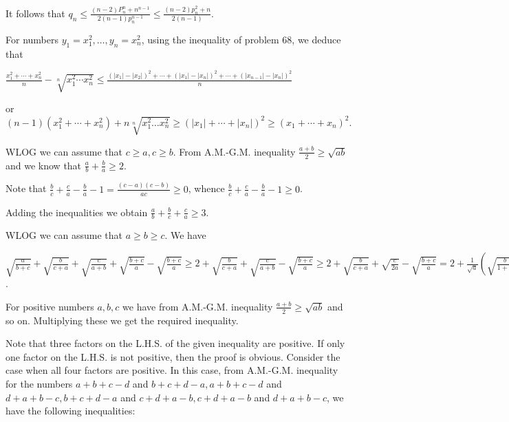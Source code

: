   It follows that $q_n\leq \frac{(n - 2)P_n^n + n^{n - 1}}{2(n - 1)p_n^{n - 1}}\leq \frac{(n - 2)p_n^2 +
    n}{2(n - 1)}$.
\item For numbers $y_1 = x_1^2, \ldots, y_n = x_n^2$, using the inequality of problem $68$, we deduce that

  $\frac{x_1^2 + \cdots + x_n^2}{n} - \sqrt[n]{x_1^2\cdots x_n^2}\leq \frac{(|x_1| - |x_2|)^2 + \cdots +
  (|x_1| - |x_n|)^2 + \cdots + (|x_{n - 1}| - |x_n|)^2}{n}$

  or $(n - 1)(x_1^2 + \cdots + x_n^2) + n\sqrt[n]{x_1^2\ldots x_n^2}\geq (|x_1| + \cdots + |x_n|)^2\geq (x_1
  + \cdots + x_n)^2$.
\item WLOG we can assume that $c\geq a, c\geq b$. From A.M.-G.M. inequality $\frac{a + b}{2}\geq \sqrt{ab}$
  and we know that $\frac{a}{b} + \frac{b}{a}\geq 2$.

  Note that $\frac{b}{c} + \frac{c}{a} - \frac{b}{a} - 1 = \frac{(c - a)(c - b)}{ac}\geq 0$, whence
  $\frac{b}{c} + \frac{c}{a} - \frac{b}{a} -1\geq 0$.

  Adding the inequalities we obtain $\frac{a}{b} + \frac{b}{c} + \frac{c}{a}\geq 3$.
\item WLOG we can assume that $a\geq b\geq c$. We have

  $\sqrt{\frac{a}{b + c}} + \sqrt{\frac{b}{c + a}} + \sqrt{\frac{c}{a + b}} + \sqrt{\frac{b + c}{a}} -
  \sqrt{\frac{b + c}{a}}\geq 2 + \sqrt{\frac{b}{c + a}} + \sqrt{\frac{c}{a + b}} - \sqrt{\frac{b +
      c}{a}}\geq 2 + \sqrt{\frac{b}{c + a}} + \sqrt{\frac{c}{2a}} - \sqrt{\frac{b + c}{a}} = 2 +
  \frac{1}{\sqrt{a}}\left(\sqrt{\frac{b}{1 + \frac{c}{a}}} + \sqrt{\frac{c}{2}} - \sqrt{b + c}\right)\geq 2
  + \frac{1}{\sqrt{a}}\left(\sqrt{\frac{b}{1 + \frac{c}{a}}} + \sqrt{\frac{c}{2}} - \sqrt{b + c}\right) = 2
  + \frac{\sqrt{c}}{\sqrt{2a(b + c)}}\left(\sqrt{b + c} - \sqrt{2c}\right)\geq 2$.
\item For positive numbers $a, b, c$ we have from A.M.-G.M. inequality $\frac{a + b}{2}\geq \sqrt{ab}$ and
  so on. Multiplying these we get the required inequality.
\item Note that three factors on the L.H.S. of the given inequality are positive. If only one factor on the
  L.H.S. is not positive, then the proof is obvious. Consider the case when all four factors are
  positive. In this case, from A.M.-G.M. inequality for the numbers $a + b + c - d$ and $b + c + d -a, a + b
  + c - d$ and $d + a + b - c, b + c + d - a$ and $c + d + a - b, c + d + a - b$ and $d + a + b - c$, we
  have the following inequalities:

